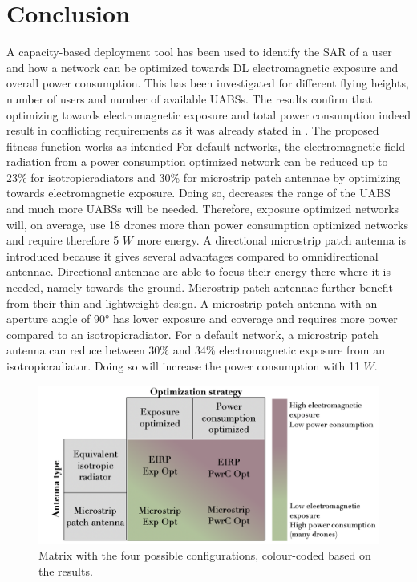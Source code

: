\documentclass[twocolumn]{phdsymp} %
\begin{document}
\section{Conclusion}

A capacity-based deployment tool has been used to identify the \gls{SAR} of a user and how a network can be optimized 
towards \gls{DL} electromagnetic exposure and overall power consumption. This has been investigated for different flying heights,
number of users and number of available \gls{UABS}s.
The  results confirm that optimizing towards electromagnetic exposure and total power consumption indeed result in 
conflicting requirements as it was already stated in  \cite{J1}. The proposed fitness function works as intended  
For default networks, the electromagnetic field radiation from a
power consumption optimized network can be reduced up to 23\% for \gls{isotropicradiator}s and 30\% for microstrip patch antennae 
by optimizing towards electromagnetic exposure. Doing so, decreases the range of the \gls{UABS} and much more \gls{UABS}s will be needed. 
Therefore, exposure optimized networks will, on average, use 18 drones more than power consumption optimized networks
and require therefore 5 $W$ more energy.
A directional microstrip patch antenna is introduced because it gives several advantages compared to omnidirectional antennae.
Directional antennae are able to focus their energy there where it is needed, namely towards the ground. Microstrip patch antennae 
further benefit from their thin and lightweight design. 
A microstrip patch antenna with an aperture  angle of \ang{90} has lower exposure and coverage and requires more power compared to an \gls{isotropicradiator}.
For a default network, a microstrip patch antenna can reduce between 30\% and 34\% electromagnetic exposure 
from an \gls{isotropicradiator}. Doing so will increase the power consumption with 11 $W$.
\begin{figure}[hb!]
\centering
  \includegraphics[width=0.8\linewidth]{../images/fourCasesMatrixSol.png}
  \caption{Matrix with the four possible configurations, colour-coded based on the results.}
  \label{fig:resultIllustration}
\end{figure}
\end{document}
